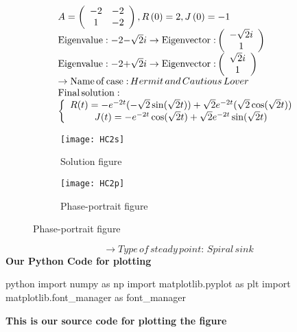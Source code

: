 \documentclass[a4paper]{article}
\begin{document}
\[\begin{array}{l}
A = \left( {\begin{array}{*{20}{c}}
{ - 2}&{ - 2}\\
1&{ - 2}
\end{array}} \right),R\left( 0 \right) = 2,J\left( 0 \right) =  - 1\\
{\rm{Eigenvalue: - 2 - }}\sqrt 2 i \to {\rm{Eigenvector:}}\left( {\begin{array}{*{20}{c}}
{ - \sqrt 2 i}\\
1
\end{array}} \right)\\
{\rm{Eigenvalue: - 2 + }}\sqrt 2 i \to {\rm{Eigenvector:}}\left( {\begin{array}{*{20}{c}}
{\sqrt 2 i}\\
1
\end{array}} \right)\\
 \to {\rm{Name}}\,{\rm{of}}\,{\rm{case:}}\,Hermit\,and\,Cautious\,Lover\\
{\rm{Final}}\,{\rm{solution:}}\\
\left\{ {\begin{array}{*{20}{c}}
{R(t) =  - {e^{ - 2t}}( - \sqrt 2 \sin (\sqrt 2 t)) + \sqrt 2 {e^{ - 2t}}(\sqrt 2 \cos (\sqrt 2 t))}\\
{J(t) =  - {e^{ - 2t}}\cos (\sqrt 2 t) + \sqrt 2 {e^{ - 2t}}\sin (\sqrt 2 t)}
\end{array}} \right.
\end{array}\]
\begin{figure}[H]
\centering
\begin{subfigure}{.5\textwidth}
  \centering
  \texttt{[image: HC2s]}
  \caption*{Solution figure}
\end{subfigure}%
\begin{subfigure}{.5\textwidth}
  \centering
  \texttt{[image: HC2p]}
  \caption*{Phase-portrait figure}
\end{subfigure}
\end{figure}
\[  \to  Type\,of\,steady\,point:\,Spiral\,sink\]
\textbf{Our Python Code for plotting}
\begin{code}{python}
import numpy as np
import matplotlib.pyplot as plt
import matplotlib.font_manager as font_manager
\end{code}
\textbf{This is our source code for plotting the figure}
\end{document}
